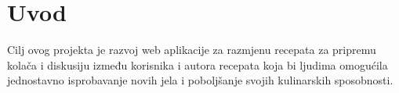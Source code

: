 	


		
		
		
		
		
		
		\section{Uvod}
		\raggedright Cilj ovog projekta je razvoj web aplikacije za razmjenu recepata za pripremu kolača i diskusiju između korisnika i autora recepata koja bi ljudima omogućila jednostavno isprobavanje novih jela i poboljšanje svojih kulinarskih sposobnosti.
